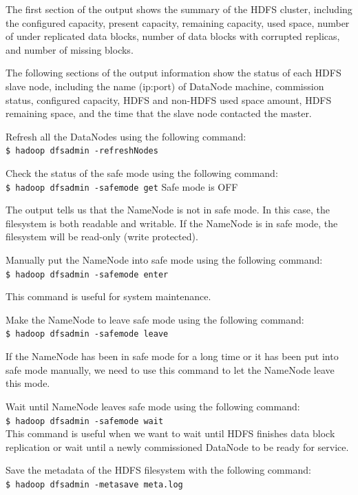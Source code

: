 The first section of the output shows the summary of the HDFS cluster, including the configured capacity, present capacity, remaining capacity, used space, number of under replicated data blocks, number of data blocks with corrupted replicas, and number of missing blocks.

The following sections of the output information show the status of each HDFS slave node, including the name (ip:port) of DataNode machine, commission status, configured capacity, HDFS and non-HDFS used space amount, HDFS remaining space, and the time that the slave node contacted the master.

Refresh all the DataNodes using the following command: \\
\verb|$ hadoop dfsadmin -refreshNodes|

Check the status of the safe mode using the following command: \\
\verb|$ hadoop dfsadmin -safemode get|
Safe mode is OFF

The output tells us that the NameNode is not in safe mode. In this case, the filesystem is both readable and writable. If the NameNode is in safe mode, the filesystem will be read-only (write protected).

Manually put the NameNode into safe mode using the following command: \\
\verb|$ hadoop dfsadmin -safemode enter|

This command is useful for system maintenance.

Make the NameNode to leave safe mode using the following command: \\
\verb|$ hadoop dfsadmin -safemode leave|

If the NameNode has been in safe mode for a long time or it has been put into safe mode manually, we need to use this command to let the NameNode leave this mode.

Wait until NameNode leaves safe mode using the following command:\\
\verb|$ hadoop dfsadmin -safemode wait|\\
This command is useful when we want to wait until HDFS finishes data block replication or wait until a newly commissioned DataNode to be ready for service.

Save the metadata of the HDFS filesystem with the following command: \\
\verb|$ hadoop dfsadmin -metasave meta.log|

